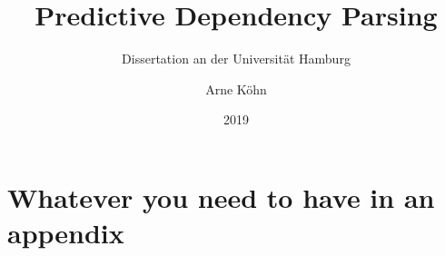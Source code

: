 \documentclass[
11pt
,english
,a4paper
,BCOR=12mm
,twoside
,headsepline,footsepline %
,fleqn
,chapterprefix=true
,titlepage
]{scrbook}
\author{Arne Köhn}
\date{2019}
\title{Predictive Dependency Parsing}
\subtitle{Dissertation an der Universität Hamburg}
\theoremstyle{definition}
\begin{document}
    \maketitle



\tableofcontents




\printbibliography

\appendix

\chapter{Whatever you need to have in an appendix}
\end{document}
